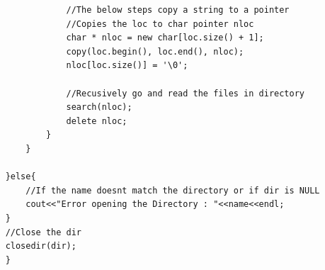 \documentclass{article}
\begin{document}
\begin{verbatim}
                //The below steps copy a string to a pointer 
                //Copies the loc to char pointer nloc
                char * nloc = new char[loc.size() + 1];
                copy(loc.begin(), loc.end(), nloc);
                nloc[loc.size()] = '\0';

                //Recusively go and read the files in directory
                search(nloc);   
                delete nloc;
            }
        }

    }else{
        //If the name doesnt match the directory or if dir is NULL
        cout<<"Error opening the Directory : "<<name<<endl;
    } 
    //Close the dir
    closedir(dir);
    }

\end{verbatim}
\end{document}
